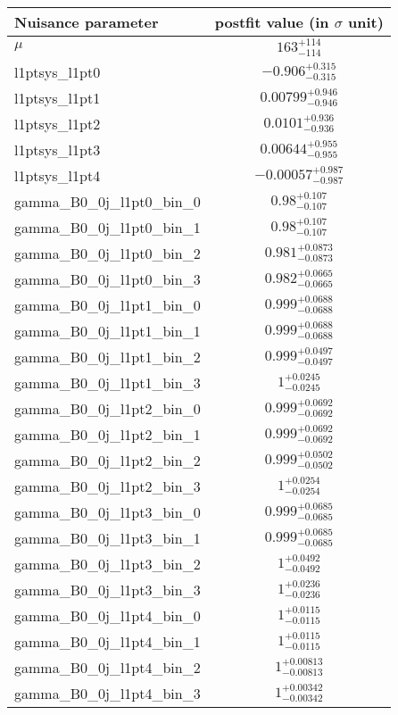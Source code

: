 
\begin{tabular}{|l|c|}
\hline
Nuisance parameter & postfit value (in $\sigma$ unit) \\\hline
$\mu$ & $163^{+114}_{-114}$ \\
l1ptsys\_l1pt0 & $-0.906^{+0.315}_{-0.315}$ \\
l1ptsys\_l1pt1 & $0.00799^{+0.946}_{-0.946}$ \\
l1ptsys\_l1pt2 & $0.0101^{+0.936}_{-0.936}$ \\
l1ptsys\_l1pt3 & $0.00644^{+0.955}_{-0.955}$ \\
l1ptsys\_l1pt4 & $-0.00057^{+0.987}_{-0.987}$ \\
gamma\_B0\_0j\_l1pt0\_bin\_0 & $0.98^{+0.107}_{-0.107}$ \\
gamma\_B0\_0j\_l1pt0\_bin\_1 & $0.98^{+0.107}_{-0.107}$ \\
gamma\_B0\_0j\_l1pt0\_bin\_2 & $0.981^{+0.0873}_{-0.0873}$ \\
gamma\_B0\_0j\_l1pt0\_bin\_3 & $0.982^{+0.0665}_{-0.0665}$ \\
gamma\_B0\_0j\_l1pt1\_bin\_0 & $0.999^{+0.0688}_{-0.0688}$ \\
gamma\_B0\_0j\_l1pt1\_bin\_1 & $0.999^{+0.0688}_{-0.0688}$ \\
gamma\_B0\_0j\_l1pt1\_bin\_2 & $0.999^{+0.0497}_{-0.0497}$ \\
gamma\_B0\_0j\_l1pt1\_bin\_3 & $1^{+0.0245}_{-0.0245}$ \\
gamma\_B0\_0j\_l1pt2\_bin\_0 & $0.999^{+0.0692}_{-0.0692}$ \\
gamma\_B0\_0j\_l1pt2\_bin\_1 & $0.999^{+0.0692}_{-0.0692}$ \\
gamma\_B0\_0j\_l1pt2\_bin\_2 & $0.999^{+0.0502}_{-0.0502}$ \\
gamma\_B0\_0j\_l1pt2\_bin\_3 & $1^{+0.0254}_{-0.0254}$ \\
gamma\_B0\_0j\_l1pt3\_bin\_0 & $0.999^{+0.0685}_{-0.0685}$ \\
gamma\_B0\_0j\_l1pt3\_bin\_1 & $0.999^{+0.0685}_{-0.0685}$ \\
gamma\_B0\_0j\_l1pt3\_bin\_2 & $1^{+0.0492}_{-0.0492}$ \\
gamma\_B0\_0j\_l1pt3\_bin\_3 & $1^{+0.0236}_{-0.0236}$ \\
gamma\_B0\_0j\_l1pt4\_bin\_0 & $1^{+0.0115}_{-0.0115}$ \\
gamma\_B0\_0j\_l1pt4\_bin\_1 & $1^{+0.0115}_{-0.0115}$ \\
gamma\_B0\_0j\_l1pt4\_bin\_2 & $1^{+0.00813}_{-0.00813}$ \\
gamma\_B0\_0j\_l1pt4\_bin\_3 & $1^{+0.00342}_{-0.00342}$ \\
\hline
\end{tabular}
